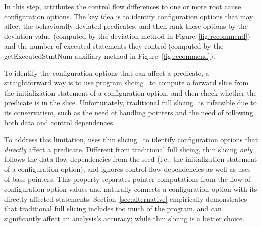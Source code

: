 



In this step, \ourtool attributes the control flow differences
to one or more root cause configuration options.
The key idea is to identify configuration options that
may affect the behaviorally-deviated predicates, and then rank
these options by the deviation value (computed by the
{deviation} method in Figure~\ref{fig:recommend})
and the number of executed statements they control (computed
by the {getExecutedStmtNum} auxiliary method in Figure~\ref{fig:recommend}).


To identify the configuration options that can affect
a predicate, a straightforward way is to use program slicing~\cite{Weiser:1981}
to compute a forward slice from the initialization statement
of a configuration option, and then check whether the predicate is
in the slice. Unfortunately, traditional
full slicing~\cite{Weiser:1981} is infeasible due
to its conservatism, such as the need of handling pointers
and the need of following both data and control dependences.


To address this limitation, \ourtool uses thin slicing~\cite{Sridharan:2007}
to identify configuration options that \textit{directly} affect
a predicate. Different from traditional full slicing,
thin slicing \textit{only} follows the data flow dependencies
from the seed (i.e., the initialization statement of a
configuration option), and ignores control flow dependencies
as well as uses of base pointers. This property separates
pointer computations from the flow of configuration option
values and naturally connects a configuration option with its
directly affected statements. Section~\ref{sec:alternative}
empirically demonstrates that traditional full slicing includes
too much of the program, and can significantly affect an analysis's
accuracy; while thin slicing is a better
choice.


